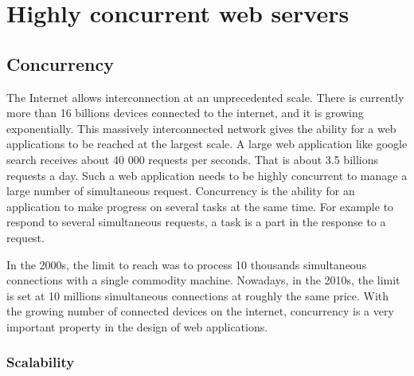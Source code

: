 \section{Highly concurrent web servers} \label{chapter2:highly-concurrent-web-servers}


\subsection{Concurrency}

The Internet allows interconnection at an unprecedented scale.
There is currently more than 16 billions devices connected to the internet, and it is growing exponentially.
This massively interconnected network gives the ability for a web applications to be reached at the largest scale.
A large web application like google search receives about 40 000 requests per seconds.
That is about 3.5 billions requests a day.
Such a web application needs to be highly concurrent to manage a large number of simultaneous request.
Concurrency is the ability for an application to make progress on several tasks at the same time.
For example to respond to several simultaneous requests, a task is a part in the response to a request. 

In the 2000s, the limit to reach was to process 10 thousands simultaneous connections with a single commodity machine.
Nowadays, in the 2010s, the limit is set at 10 millions simultaneous connections at roughly the same price.
With the growing number of connected devices on the internet, concurrency is a very important property in the design of web applications.

\subsubsection{Scalability}


